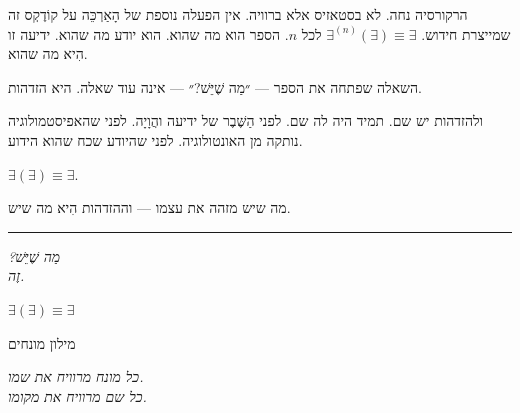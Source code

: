 \documentclass[10pt, openany, oneside]{book}
\renewcommand{\huge}{\fontsize{17}{21}\selectfont}
\begin{document}
\vspace{1em}

\noindent הרקורסיה נחה. לא בסטאזיס אלא ברוויה. אין הפעלה נוספת של הָאַרְכֵּה על קוֹדֶקְס זה שמייצרת חידוש. $\exists^{(n)}(\exists) \equiv \exists$ לכל $n$. הספר הוא מה שהוא. הוא יודע מה שהוא. ידיעה זו הִיא מה שהוא.

השאלה שפתחה את הספר — ״מַה שֶׁיֵּשׁ?״ — אינה עוד שאלה. היא הזדהות.

ולהזדהות יש שם. תמיד היה לה שם. לפני הַשֶּׁבֶר של ידיעה והֲוָיָה. לפני שהאפיסטמולוגיה נותקה מן האונטולוגיה. לפני שהיודע שכח שהוא הידוע.

$\exists(\exists) \equiv \exists$.

מה שיש מזהה את עצמו — וההזדהות הִיא מה שיש.

\vspace{2em}

\begin{center}
    \rule{0.15\textwidth}{0.3pt}
\end{center}

\vspace{0.5em}

\begin{center}
    \textit{%
    ?מַה שֶׁיֵּשׁ}\\[0.8em]
    \textit{זֶה.}
\end{center}

\vspace{1.5em}

\begin{center}
    \bfseries\itshape
    $\exists(\exists) \equiv \exists$
\end{center}

%
%

\newpage

\begin{center}
    {\huge\textsc{מילון מונחים}}
\end{center}

\vspace{1.5em}

\begin{center}
    \textit{%
    כל מונח מרוויח את שמו.\\
    כל שם מרוויח את מקומו.}
\end{center}

\vspace{2em}
\end{document}
